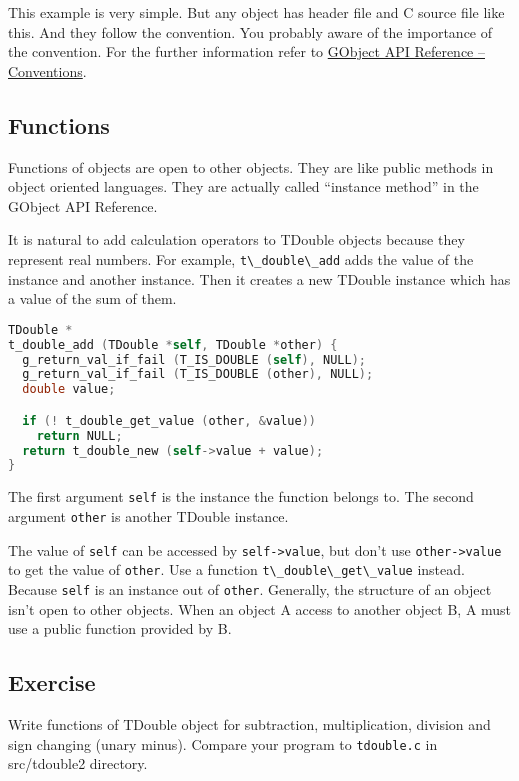 This example is very simple. But any object has header file and C source
file like this. And they follow the convention. You probably aware of
the importance of the convention. For the further information refer to
\href{https://docs.gtk.org/gobject/concepts.html\#conventions}{GObject
API Reference -- Conventions}.

\subsection{Functions}\label{functions}

Functions of objects are open to other objects. They are like public
methods in object oriented languages. They are actually called
``instance method'' in the GObject API Reference.

It is natural to add calculation operators to TDouble objects because
they represent real numbers. For example,
\passthrough{\lstinline!t\_double\_add!} adds the value of the instance
and another instance. Then it creates a new TDouble instance which has a
value of the sum of them.

\begin{lstlisting}[language=C]
TDouble *
t_double_add (TDouble *self, TDouble *other) {
  g_return_val_if_fail (T_IS_DOUBLE (self), NULL);
  g_return_val_if_fail (T_IS_DOUBLE (other), NULL);
  double value;

  if (! t_double_get_value (other, &value))
    return NULL;
  return t_double_new (self->value + value);
}
\end{lstlisting}

The first argument \passthrough{\lstinline!self!} is the instance the
function belongs to. The second argument \passthrough{\lstinline!other!}
is another TDouble instance.

The value of \passthrough{\lstinline!self!} can be accessed by
\passthrough{\lstinline!self->value!}, but don't use
\passthrough{\lstinline!other->value!} to get the value of
\passthrough{\lstinline!other!}. Use a function
\passthrough{\lstinline!t\_double\_get\_value!} instead. Because
\passthrough{\lstinline!self!} is an instance out of
\passthrough{\lstinline!other!}. Generally, the structure of an object
isn't open to other objects. When an object A access to another object
B, A must use a public function provided by B.

\subsection{Exercise}\label{exercise}

Write functions of TDouble object for subtraction, multiplication,
division and sign changing (unary minus). Compare your program to
\passthrough{\lstinline!tdouble.c!} in src/tdouble2 directory.
